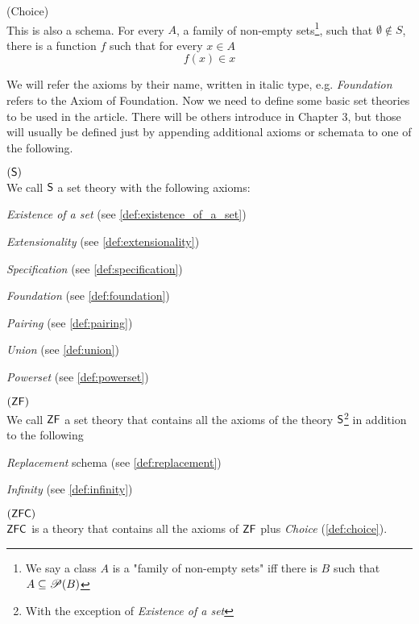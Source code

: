 \begin{definition}{(Choice)}\label{def:choice}\\
This is also a schema. For every $A$, a family of non-empty sets\footnote{We say a class $A$ is a "family of non-empty sets" iff there is $B$ such that $A \subseteq \mathscr{P} (B)$}, such that $\emptyset \not\in S$, there is a function $f$ such that for every $x \in A$
\begin{equation}
f(x) \in x
\end{equation}
\end{definition}

We will refer the axioms by their name, written in italic type, e.g. \emph{Foundation} refers to the Axiom of Foundation. Now we need to define some basic set theories to be used in the article. There will be others introduce in Chapter 3, but those will usually be defined just by appending additional axioms or schemata to one of the following.

\begin{definition}{$(\sf{S})$}\label{def:s}\\
We call $\sf{S}$ a set theory with the following axioms:
\bce[(i)]
\item \emph{Existence of a set} (see \ref{def:existence_of_a_set})
\item \emph{Extensionality} (see \ref{def:extensionality})
\item \emph{Specification} (see \ref{def:specification})
\item \emph{Foundation} (see \ref{def:foundation})
\item \emph{Pairing} (see \ref{def:pairing})
\item \emph{Union} (see \ref{def:union})
\item \emph{Powerset} (see \ref{def:powerset})
\ece
\end{definition}

\begin{definition}{$(\sf{ZF})$}\label{def:zf}\\
We call $\sf{ZF}$ a set theory that contains all the axioms of the theory $\sf{S}$\footnote{With the exception of \emph{Existence of a set}} in addition to the following
\bce[(i)]
\item \emph{Replacement} schema (see \ref{def:replacement})
\item \emph{Infinity} (see \ref{def:infinity})
\ece
\end{definition}

\begin{definition}{$(\sf{ZFC})$}\label{def:zfc}\\
$\sf{ZFC}$ is a theory that contains all the axioms of $\sf{ZF}$ plus \emph{Choice} (\ref{def:choice}).
\end{definition}

